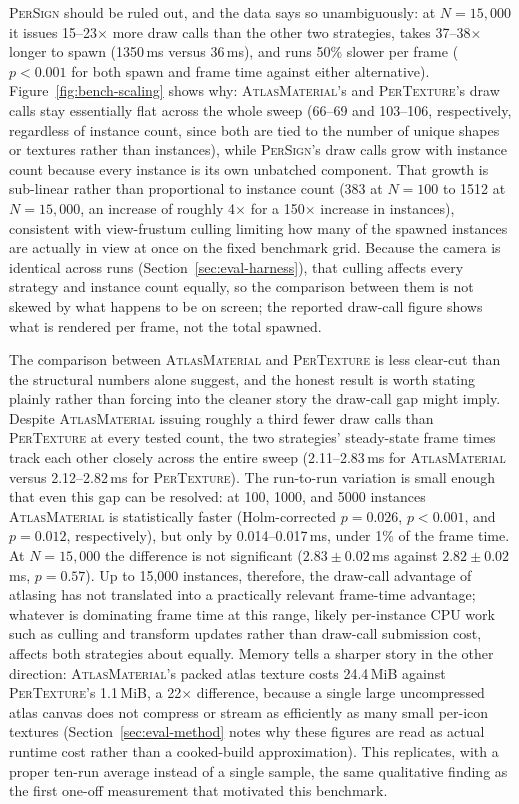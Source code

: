 \textsc{PerSign} should be ruled out, and the data says so unambiguously: at \(N=15{,}000\) it issues 15--23\(\times\) more draw calls than the other two strategies, takes 37--38\(\times\) longer to spawn (1350\,ms versus 36\,ms), and runs 50\% slower per frame (\(p<0.001\) for both spawn and frame time against either alternative). Figure~\ref{fig:bench-scaling} shows why: \textsc{AtlasMaterial}'s and \textsc{PerTexture}'s draw calls stay essentially flat across the whole sweep (66--69 and 103--106, respectively, regardless of instance count, since both are tied to the number of unique shapes or textures rather than instances), while \textsc{PerSign}'s draw calls grow with instance count because every instance is its own unbatched component. That growth is sub-linear rather than proportional to instance count (383 at \(N=100\) to 1512 at \(N=15{,}000\), an increase of roughly 4\(\times\) for a 150\(\times\) increase in instances), consistent with view-frustum culling limiting how many of the spawned instances are actually in view at once on the fixed benchmark grid. Because the camera is identical across runs (Section~\ref{sec:eval-harness}), that culling affects every strategy and instance count equally, so the comparison between them is not skewed by what happens to be on screen; the reported draw-call figure shows what is rendered per frame, not the total spawned.

The comparison between \textsc{AtlasMaterial} and \textsc{PerTexture} is less clear-cut than the structural numbers alone suggest, and the honest result is worth stating plainly rather than forcing into the cleaner story the draw-call gap might imply. Despite \textsc{AtlasMaterial} issuing roughly a third fewer draw calls than \textsc{PerTexture} at every tested count, the two strategies' steady-state frame times track each other closely across the entire sweep (2.11--2.83\,ms for \textsc{AtlasMaterial} versus 2.12--2.82\,ms for \textsc{PerTexture}). The run-to-run variation is small enough that even this gap can be resolved: at 100, 1000, and 5000 instances \textsc{AtlasMaterial} is statistically faster (Holm-corrected \(p=0.026\), \(p<0.001\), and \(p=0.012\), respectively), but only by 0.014--0.017\,ms, under 1\% of the frame time. At \(N=15{,}000\) the difference is not significant (\(2.83 \pm 0.02\)\,ms against \(2.82 \pm 0.02\)\,ms, \(p=0.57\)). Up to 15,000 instances, therefore, the draw-call advantage of atlasing has not translated into a practically relevant frame-time advantage; whatever is dominating frame time at this range, likely per-instance CPU work such as culling and transform updates rather than draw-call submission cost, affects both strategies about equally. Memory tells a sharper story in the other direction: \textsc{AtlasMaterial}'s packed atlas texture costs 24.4\,MiB against \textsc{PerTexture}'s 1.1\,MiB, a 22\(\times\) difference, because a single large uncompressed atlas canvas does not compress or stream as efficiently as many small per-icon textures (Section~\ref{sec:eval-method} notes why these figures are read as actual runtime cost rather than a cooked-build approximation). This replicates, with a proper ten-run average instead of a single sample, the same qualitative finding as the first one-off measurement that motivated this benchmark.

